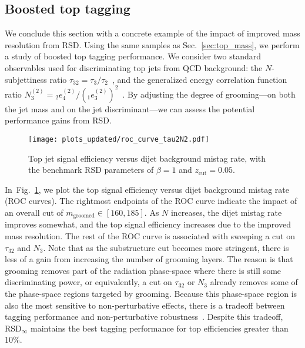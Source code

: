 \documentclass[11pt,a4paper]{article}
\newcommand{\zcut}{z_\text{cut}}
\DeclareRobustCommand{\Sec}[1]{Sec.~\ref{#1}}
\DeclareRobustCommand{\Fig}[1]{Fig.~\ref{#1}}
\begin{document}
\subsection{Boosted top tagging}
\label{sec:boosted-toptag}

We conclude this section with a concrete example of the impact of improved mass resolution from RSD.
%
Using the same samples as \Sec{sec:top_mass}, we perform a study of boosted top tagging performance.
%
We consider two standard observables used for discriminating top jets from QCD background:
%
the $N$-subjettiness ratio
$\tau_{32}=\tau_3/\tau_2$~\cite{Thaler:2010tr,Thaler:2011gf}, and the generalized
energy correlation function ratio $N_3^{(2)} = {}_2e^{(2)}_{4}/({}_1e^{(2)}_3)^2$~\cite{Larkoski:2013eya,Moult:2016cvt}.
%
By adjusting the degree of grooming---on both the jet mass and on the jet discriminant---we can assess the potential performance gains from RSD.

\begin{figure}
  \centering
  \texttt{[image: plots\_updated/roc\_curve\_tau2N2.pdf]}
  \caption{Top jet signal efficiency versus dijet background mistag rate, with the benchmark RSD parameters of $\beta=1$ and $\zcut=0.05$.}
  \label{fig:discrim-ROC}
\end{figure}

In~\Fig{fig:discrim-ROC}, we plot the top signal efficiency versus dijet background mistag rate (ROC curves).
%
The rightmost endpoints of the ROC curve indicate the impact of an overall cut of $m_{\text{groomed}}\in[160,185]$.
%
As $N$ increases, the dijet mistag rate improves somewhat, and the
top signal efficiency increases due to the improved mass
resolution.
%
The rest of the ROC curve is associated with sweeping a cut on $\tau_{32}$ and $N_3$.
%
Note that as the substructure cut becomes more stringent, there is less of a gain from increasing the number of grooming layers.
%
The reason is that grooming removes part of the radiation phase-space where there is still some discriminating power, or equivalently, a cut on $\tau_{32}$ or $N_3$ already removes some of the phase-space regions targeted by grooming.
%
Because this phase-space region is also the most sensitive to non-perturbative effects, there is a tradeoff between tagging performance and non-perturbative robustness~\cite{Dasgupta:2016ktv}.
%
Despite this tradeoff, RSD$_\infty$ maintains the best tagging performance for top efficiencies greater than 10\%.
\end{document}
